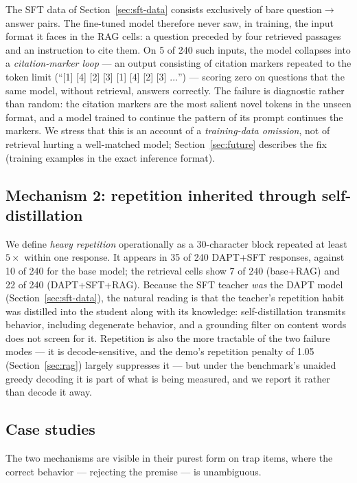 \documentclass[11pt]{article}
\begin{document}
The SFT data of Section~\ref{sec:sft-data} consists exclusively of bare
question$\rightarrow$answer pairs. The fine-tuned model therefore never
saw, in training, the input format it faces in the RAG cells: a question
preceded by four retrieved passages and an instruction to cite them. On
5 of 240 such inputs, the model collapses into a \emph{citation-marker
loop} --- an output consisting of citation markers repeated to the token
limit (``[1] [4] [2] [3] [1] [4] [2] [3] $\ldots$'') --- scoring zero on
questions that the same model, without retrieval, answers correctly. The
failure is diagnostic rather than random: the citation markers are the
most salient novel tokens in the unseen format, and a model trained to
continue the pattern of its prompt continues the markers. We stress that
this is an account of a \emph{training-data omission}, not of retrieval
hurting a well-matched model; Section~\ref{sec:future} describes the
fix (training examples in the exact inference format).

\subsection{Mechanism 2: repetition inherited through self-distillation}

We define \emph{heavy repetition} operationally as a 30-character block
repeated at least $5\times$ within one response. It appears in 35 of 240
DAPT+SFT responses, against 10 of 240 for the base model; the retrieval
cells show 7 of 240 (base+RAG) and 22 of 240 (DAPT+SFT+RAG). Because the
SFT teacher \emph{was} the DAPT model (Section~\ref{sec:sft-data}), the
natural reading is that the teacher's repetition habit was distilled into
the student along with its knowledge: self-distillation transmits
behavior, including degenerate behavior, and a grounding filter on
content words does not screen for it. Repetition is also the more
tractable of the two failure modes --- it is decode-sensitive, and the
demo's repetition penalty of 1.05 (Section~\ref{sec:rag}) largely
suppresses it --- but under the benchmark's unaided greedy decoding it is
part of what is being measured, and we report it rather than decode it
away.

\subsection{Case studies}

The two mechanisms are visible in their purest form on trap items, where
the correct behavior --- rejecting the premise --- is unambiguous.
\end{document}
